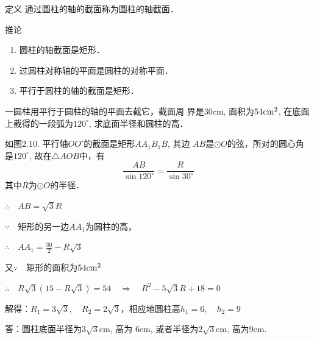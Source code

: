 \begin{blk}{定义}
    通过圆柱的轴的截面称为圆柱的轴截面．
\end{blk}

\begin{blk}{推论}
\begin{enumerate}
    \item 圆柱的轴截面是矩形．
    \item 过圆柱对称轴的平面是圆柱的对称平面．
    \item 平行于圆柱的轴的截面是矩形．
\end{enumerate}
\end{blk}

\begin{example}
    一圆柱用平行于圆柱的轴的平面去截它，截面周
界是30cm, 面积为54${\rm cm}^2$, 在底面上截得的一段弧为$120^{\circ}$, 求底面半径和圆柱的高．
\end{example}

\begin{figure}[htp]
    \centering
{}
    \caption{}
\end{figure}

\begin{solution}
    如图2.10. 平行轴$OO'$的截面是矩形$AA_1B_1B$, 其边
$AB$是$\odot O$的弦，所对的圆心角是$120^{\circ}$, 故在$\triangle AOB$中，有
\[\frac{AB}{\sin 120^{\circ}}=\frac{R}{\sin 30^{\circ}}\]
其中$R$为$\odot O$的半径．

$\therefore\quad AB=\sqrt{3}R$

$\because\quad $矩形的另一边$AA_1$为圆柱的高，

$\therefore\quad AA_1=\frac{30}{2}-R\sqrt{3}$

又$\because\quad $矩形的面积为$54{\rm cm^2}$

$\therefore\quad R\sqrt{3}\left(15-R\sqrt{3}\right)=54 \quad \Rightarrow\quad R^2-5\sqrt{3}R+18=0$

解得：$R_1=3\sqrt{3},\quad R_2=2\sqrt{3}$，相应地圆柱高$h_1=6,\quad h_2=9$

答：圆柱底面半径为$3\sqrt{3}$cm, 高为
6cm, 或者半径为$2\sqrt{3}$cm, 高为9cm.
\end{solution}


